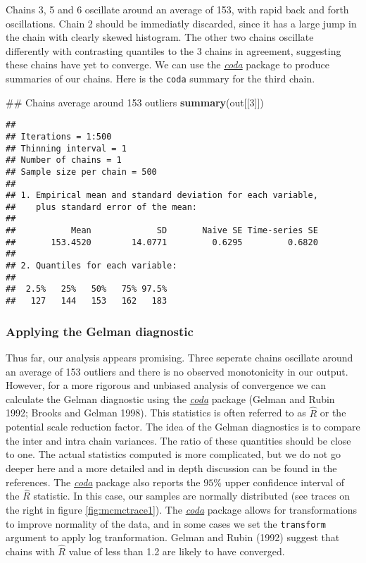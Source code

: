 \documentclass[]{article}
\newenvironment{Shaded}{\begin{snugshade}}{\end{snugshade}}
\newcommand{\KeywordTok}[1]{\textcolor[rgb]{0.13,0.29,0.53}{\textbf{{#1}}}}
\newcommand{\DecValTok}[1]{\textcolor[rgb]{0.00,0.00,0.81}{{#1}}}
\newcommand{\NormalTok}[1]{{#1}}
\begin{document}
Chains 3, 5 and 6 oscillate around an average of 153, with rapid back
and forth oscillations. Chain 2 should be immediatly discarded, since it
has a large jump in the chain with clearly skewed histogram. The other
two chains oscillate differently with contrasting quantiles to the 3
chains in agreement, suggesting these chains have yet to converge. We
can use the \emph{\href{https://CRAN.R-project.org/package=coda}{coda}}
package to produce summaries of our chains. Here is the \texttt{coda}
summary for the third chain.

\begin{Shaded}
\begin{Highlighting}[]
\NormalTok{## Chains average around 153 outliers}
\KeywordTok{summary}\NormalTok{(out[[}\DecValTok{3}\NormalTok{]])}
\end{Highlighting}
\end{Shaded}

\begin{verbatim}
## 
## Iterations = 1:500
## Thinning interval = 1 
## Number of chains = 1 
## Sample size per chain = 500 
## 
## 1. Empirical mean and standard deviation for each variable,
##    plus standard error of the mean:
## 
##           Mean             SD       Naive SE Time-series SE 
##       153.4520        14.0771         0.6295         0.6820 
## 
## 2. Quantiles for each variable:
## 
##  2.5%   25%   50%   75% 97.5% 
##   127   144   153   162   183
\end{verbatim}

\subsubsection{Applying the Gelman
diagnostic}\label{applying-the-gelman-diagnostic}

Thus far, our analysis appears promising. Three seperate chains
oscillate around an average of 153 outliers and there is no observed
monotonicity in our output. However, for a more rigorous and unbiased
analysis of convergence we can calculate the Gelman diagnostic using the
\emph{\href{https://CRAN.R-project.org/package=coda}{coda}} package
(Gelman and Rubin 1992; Brooks and Gelman 1998). This statistics is
often referred to as \(\hat{R}\) or the potential scale reduction
factor. The idea of the Gelman diagnostics is to compare the inter and
intra chain variances. The ratio of these quantities should be close to
one. The actual statistics computed is more complicated, but we do not
go deeper here and a more detailed and in depth discussion can be found
in the references. The
\emph{\href{https://CRAN.R-project.org/package=coda}{coda}} package also
reports the \(95\%\) upper confidence interval of the \(\hat{R}\)
statistic. In this case, our samples are normally distributed (see
traces on the right in figure \ref{fig:mcmctrace1}). The
\emph{\href{https://CRAN.R-project.org/package=coda}{coda}} package
allows for transformations to improve normality of the data, and in some
cases we set the \texttt{transform} argument to apply log tranformation.
Gelman and Rubin (1992) suggest that chains with \(\hat{R}\) value of
less than 1.2 are likely to have converged.
\end{document}
